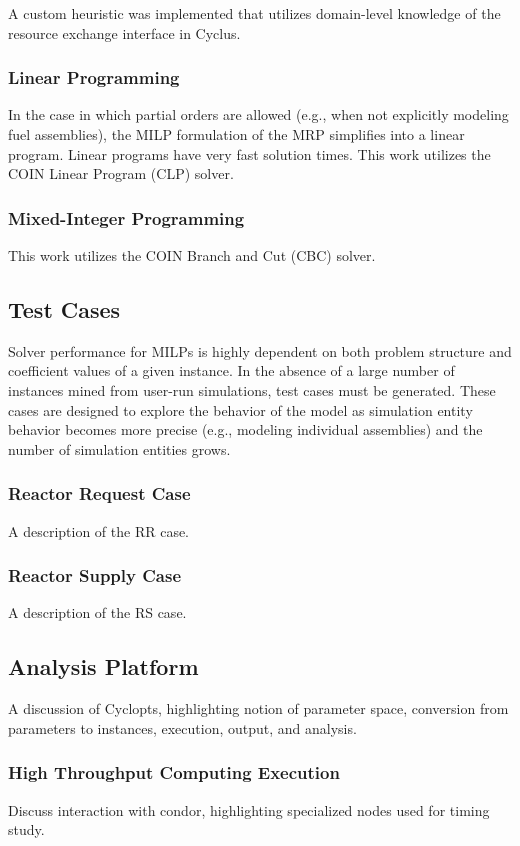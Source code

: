 A custom heuristic was implemented that utilizes domain-level knowledge of the
resource exchange interface in Cyclus.

\subsubsection{Linear Programming}

In the case in which partial orders are allowed (e.g., when not explicitly
modeling fuel assemblies), the MILP formulation of the MRP simplifies into a
linear program. Linear programs have very fast solution times. This work
utilizes the COIN Linear Program (CLP) solver.

\subsubsection{Mixed-Integer Programming}

This work utilizes the COIN Branch and Cut (CBC) solver. 

\subsection{Test Cases}

Solver performance for MILPs is highly dependent on both problem structure and
coefficient values of a given instance. In the absence of a large number of
instances mined from user-run simulations, test cases must be generated. These
cases are designed to explore the behavior of the model as simulation entity
behavior becomes more precise (e.g., modeling individual assemblies) and the
number of simulation entities grows.

\subsubsection{Reactor Request Case}

A description of the RR case.

\subsubsection{Reactor Supply Case}

A description of the RS case.

\subsection{Analysis Platform}

A discussion of Cyclopts, highlighting notion of parameter space, conversion
from parameters to instances, execution, output, and analysis. 

\subsubsection{High Throughput Computing Execution}

Discuss interaction with condor, highlighting specialized nodes used for timing study.
